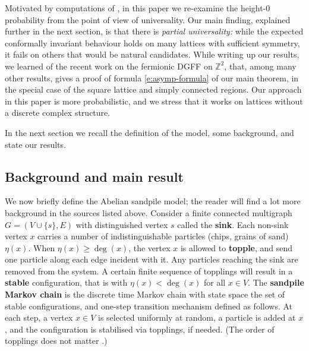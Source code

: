 \documentclass[11pt]{article}
\theoremstyle{remark}
\def\Z{\mathbb{Z}}
\begin{document}
Motivated by computations of \cite{JPR06,PonceletRuelle17,PonceletRuelle18}, in this paper 
we re-examine the height-$0$ probability from the point of view of universality. Our main 
finding, explained further in the next section, is that there is \emph{partial universality:}
while the expected conformally invariant behaviour holds on many lattices with sufficient
symmetry, it fails on others that would be natural candidates. While writing up our results,
we learned of the recent work \cite{A-CR25} on the fermionic DGFF on $\Z^2$, that, 
among many other results, gives a proof of formula \eqref{e:asymp-formula} of our main 
theorem, in the special case of the square lattice and simply connected regions. 
Our approach in this paper is more probabilistic, and we stress that it works on 
lattices without a discrete complex structure. 

In the next section we recall the definition of the model, some background, and state 
our results.


\subsection{Background and main result}
\label{ssec:main-result}

We now briefly define the Abelian sandpile model; the reader will find a lot more background in the 
sources listed above. Consider a finite connected multigraph $G = (V \cup \{s\}, E)$ with 
distinguished vertex $s$ called the \textbf{sink}. Each non-sink vertex $x$ carries a number of 
indistinguishable particles (chips, grains of sand) $\eta(x)$. When $\eta(x) \ge \deg(x)$, 
the vertex $x$ is allowed to \textbf{topple}, and send one particle along each edge incident with it.
Any particles reaching the sink are removed from the system. A certain finite sequence of topplings 
will result in a \textbf{stable} configuration, that is with $\eta(x) < \deg(x)$ for all $x \in V$.
The \textbf{sandpile Markov chain} is the discrete time Markov chain with state space the set of stable 
configurations, and one-step transition mechanism defined as follows. At each step, a vertex $x \in V$ is
selected uniformly at random, a particle is added at $x$, and the configuration is stabilised via topplings,
if needed. (The order of topplings does not matter \cite{Dhar1990}.)
\end{document}
